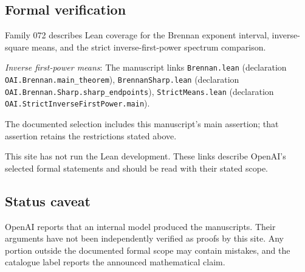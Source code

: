 \documentclass[11pt]{article}
\begin{document}
\subsection{Formal verification}
Family 072 describes Lean coverage for the Brennan exponent interval, inverse-square means, and the strict inverse-first-power spectrum comparison.

\textit{Inverse first-power means}: The manuscript links \texttt{Brennan.lean} (declaration \texttt{OAI.Brennan.main\_theorem}), \texttt{BrennanSharp.lean} (declaration \texttt{OAI.Brennan.Sharp.sharp\_endpoints}), \texttt{StrictMeans.lean} (declaration \texttt{OAI.StrictInverseFirstPower.main}).

The documented selection includes this manuscript’s main assertion; that assertion retains the restrictions stated above.

This site has not run the Lean development. These links describe OpenAI’s selected formal statements and should be read with their stated scope.

\subsection{Status caveat}
OpenAI reports that an internal model produced the manuscripts. Their arguments have not been independently verified as proofs by this site. Any portion outside the documented formal scope may contain mistakes, and the catalogue label reports the announced mathematical claim.
\end{document}
